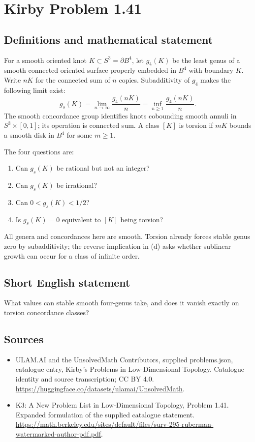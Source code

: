 \documentclass[11pt,a4paper]{article}
\begin{document}
\section*{Kirby Problem 1.41}\label{statement}

\subsection{Definitions and mathematical statement}
For a smooth oriented knot $K\subset S^3=\partial B^4$, let $g_4(K)$ be the least
genus of a smooth connected oriented surface properly embedded in $B^4$ with
boundary $K$. Write $nK$ for the connected sum of $n$ copies. Subadditivity of
$g_4$ makes the following limit exist:
\[
g_s(K)=\lim_{n\to\infty}\frac{g_4(nK)}n
=\inf_{n\geq1}\frac{g_4(nK)}n.
\]
The smooth concordance group identifies knots cobounding smooth annuli in
$S^3\times[0,1]$; its operation is connected sum. A class $[K]$ is torsion if
$mK$ bounds a smooth disk in $B^4$ for some $m\geq1$.

The four questions are:
\begin{enumerate}
\item Can $g_s(K)$ be rational but not an integer?
\item Can $g_s(K)$ be irrational?
\item Can $0<g_s(K)<1/2$?
\item Is $g_s(K)=0$ equivalent to $[K]$ being torsion?
\end{enumerate}
All genera and concordances here are smooth. Torsion already forces stable
genus zero by subadditivity; the reverse implication in (d) asks whether
sublinear growth can occur for a class of infinite order.
\subsection{Short English statement}
What values can stable smooth four-genus take, and does it vanish exactly on torsion concordance classes?
\subsection{Sources}
\begin{itemize}
\item[S1] ULAM.AI and the UnsolvedMath Contributors, supplied problems.json, catalogue entry, Kirby's Problems in Low-Dimensional Topology. Catalogue identity and source transcription; CC BY 4.0.
\url{https://huggingface.co/datasets/ulamai/UnsolvedMath}.
\item[S2] K3: A New Problem List in Low-Dimensional Topology, Problem 1.41. Expanded formulation of the supplied catalogue statement.
\url{https://math.berkeley.edu/sites/default/files/surv-295-ruberman-watermarked-author-pdf.pdf}.
\end{itemize}
\end{document}
